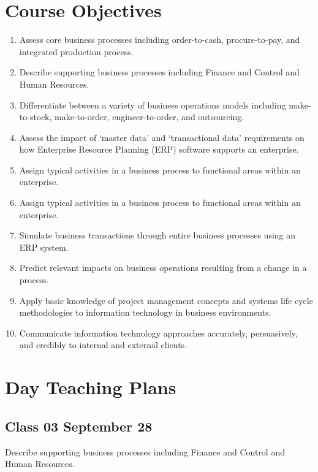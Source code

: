 \section {Course Objectives }
\begin{enumerate}
    \item   Assess core business processes including order-to-cash, procure-to-pay, and integrated production process.
    \item   Describe supporting business processes including Finance and Control and Human Resources.
    \item   Differentiate between a variety of business operations models including make-to-stock, make-to-order, engineer-to-order, and outsourcing.
    \item   Assess the impact of ‘master data’ and ‘transactional data’ requirements on how Enterprise Resource Planning (ERP) software supports an enterprise.
    \item   Assign typical activities in a business process to functional areas within an enterprise.
    \item   Assign typical activities in a business process to functional areas within an enterprise.
    \item   Simulate business transactions through entire business processes using an ERP system.
    \item   Predict relevant impacts on business operations resulting from a change in a process.
    \item   Apply basic knowledge of project management concepts and systems life cycle methodologies to information technology in business environments.
    \item   Communicate information technology approaches accurately, persuasively, and credibly to internal and external clients.
\end{enumerate}

\section {Day Teaching Plans} 





\subsection{ Class 03 September 28 }
    Describe supporting business processes including Finance and Control and Human Resources.
